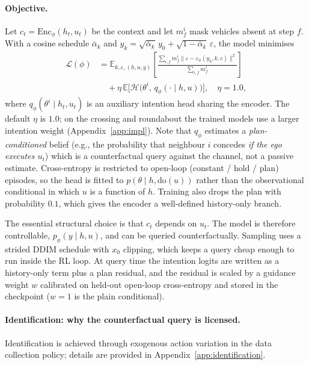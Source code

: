 \documentclass[conference]{IEEEtran}
\newcommand{\Expect}{\mathbb{E}}
\begin{document}
\paragraph{Objective.} Let $c_t = \mathrm{Enc}_\phi(h_t, u_t)$ be the context and
let $m^i_f$ mask vehicles absent at step $f$. With a cosine schedule
$\bar\alpha_k$ and $y_k = \sqrt{\bar\alpha_k}\,y_0 + \sqrt{1-\bar\alpha_k}\,
\varepsilon$, the model minimises
\begin{align}
\mathcal{L}(\phi)
&= \Expect_{k,\varepsilon,(h,u,y)}\!\left[
\frac{\sum_{i,f} m^i_f \|\varepsilon - \varepsilon_\phi(y_k,k,c)\|^2}
{\sum_{i,f} m^i_f}\right] \nonumber \\
&\quad + \eta\, \Expect\big[\mathcal{H}\big(\theta^i,\, q_\phi(\cdot \mid h,u)\big)\big],
\quad \eta = 1.0,
\label{eq:loss}
\end{align}
where $q_\phi(\theta^i \mid h_t, u_t)$ is an auxiliary intention head sharing the
encoder. The default $\eta$ is $1.0$; on the crossing and roundabout the trained
models use a larger intention weight (Appendix~\ref{app:impl}). Note that $q_\phi$ estimates a \emph{plan-conditioned} belief (e.g., the
probability that neighbour $i$ concedes \emph{if the ego executes $u_t$}) which
is a counterfactual query against the channel, not a passive estimate.
Cross-entropy is restricted to open-loop (constant / hold / plan) episodes, so
the head is fitted to $p(\theta \mid h, \mathrm{do}(u))$ rather than the
observational conditional in which $u$ is a function of $h$. Training also
drops the plan with probability $0.1$, which gives the encoder a well-defined
history-only branch.

The essential structural choice is that $c_t$ depends on $u_t$. The model is
therefore controllable, $p_\phi(y \mid h, u)$, and can be queried
counterfactually. Sampling uses a strided DDIM schedule with $x_0$ clipping,
which keeps a query cheap enough to run inside the RL loop. At query time the
intention logits are written as a history-only term plus a plan residual, and
the residual is scaled by a guidance weight $w$ calibrated on held-out open-loop
cross-entropy and stored in the checkpoint ($w{=}1$ is the plain conditional).

\paragraph{Identification: why the counterfactual query is licensed.}

Identification is achieved through exogenous action variation in the data collection policy; details are provided in Appendix~\ref{app:identification}.
\end{document}
